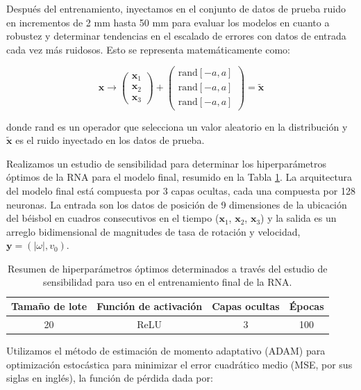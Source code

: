 \documentclass[12pt,a4paper]{article}
\begin{document}
Después del entrenamiento, inyectamos en el conjunto de datos de prueba ruido en incrementos de 2 mm hasta 50 mm para evaluar los modelos en cuanto a robustez y determinar tendencias en el escalado de errores con datos de entrada cada vez más ruidosos. Esto se representa matemáticamente como:

\begin{equation}
\mathbf{x} \rightarrow \begin{pmatrix} \mathbf{x}_1 \\ \mathbf{x}_2 \\ \mathbf{x}_3 \end{pmatrix} + \begin{pmatrix} \text{rand}[-a, a] \\ \text{rand}[-a, a] \\ \text{rand}[-a, a] \end{pmatrix} = \tilde{\mathbf{x}}
\end{equation}

donde rand es un operador que selecciona un valor aleatorio en la distribución y $\tilde{\mathbf{x}}$ es el ruido inyectado en los datos de prueba.

Realizamos un estudio de sensibilidad para determinar los hiperparámetros óptimos de la RNA para el modelo final, resumido en la Tabla \ref{tab:hiperparametros}. La arquitectura del modelo final está compuesta por 3 capas ocultas, cada una compuesta por 128 neuronas. La entrada son los datos de posición de 9 dimensiones de la ubicación del béisbol en cuadros consecutivos en el tiempo ($\mathbf{x}_1$, $\mathbf{x}_2$, $\mathbf{x}_3$) y la salida es un arreglo bidimensional de magnitudes de tasa de rotación y velocidad, $\mathbf{y} = (|\omega|, v_0)$.

\begin{table}[H]
\centering
\caption{Resumen de hiperparámetros óptimos determinados a través del estudio de sensibilidad para uso en el entrenamiento final de la RNA.}
\label{tab:hiperparametros}
\begin{tabular}{@{}cccc@{}}
\toprule
Tamaño de lote & Función de activación & Capas ocultas & Épocas \\
\midrule
20 & ReLU & 3 & 100 \\
\bottomrule
\end{tabular}
\end{table}

Utilizamos el método de estimación de momento adaptativo (ADAM) para optimización estocástica \citep{kingma2014} para minimizar el error cuadrático medio (MSE, por sus siglas en inglés), la función de pérdida dada por:
\end{document}
